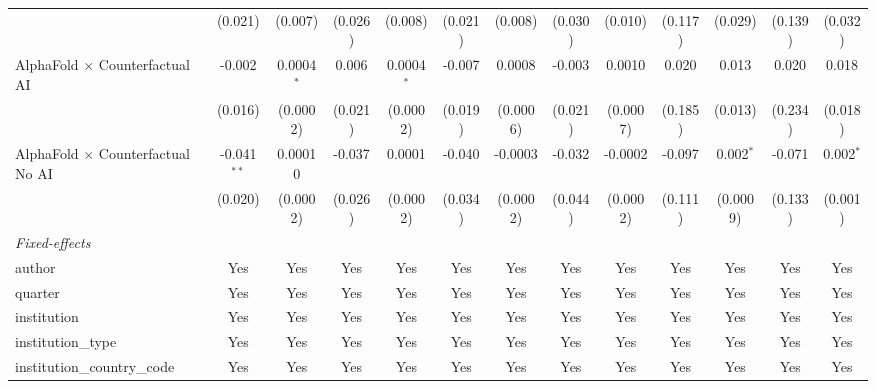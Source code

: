 \begin{tabular}{lcccccccccccc}
                                            & (0.021)       & (0.007)       & (0.026) & (0.008)      & (0.021)      & (0.008)        & (0.030)      & (0.010)        & (0.117) & (0.029)      & (0.139) & (0.032)\\   
   AlphaFold $\times$ Counterfactual AI     & -0.002        & 0.0004$^{*}$  & 0.006   & 0.0004$^{*}$ & -0.007       & 0.0008         & -0.003       & 0.0010         & 0.020   & 0.013        & 0.020   & 0.018\\   
                                            & (0.016)       & (0.0002)      & (0.021) & (0.0002)     & (0.019)      & (0.0006)       & (0.021)      & (0.0007)       & (0.185) & (0.013)      & (0.234) & (0.018)\\   
   AlphaFold $\times$ Counterfactual No AI  & -0.041$^{**}$ & 0.00010       & -0.037  & 0.0001       & -0.040       & -0.0003        & -0.032       & -0.0002        & -0.097  & 0.002$^{*}$  & -0.071  & 0.002$^{*}$\\   
                                            & (0.020)       & (0.0002)      & (0.026) & (0.0002)     & (0.034)      & (0.0002)       & (0.044)      & (0.0002)       & (0.111) & (0.0009)     & (0.133) & (0.001)\\   
   \midrule
   \emph{Fixed-effects}\\
   author                                   & Yes           & Yes           & Yes     & Yes          & Yes          & Yes            & Yes          & Yes            & Yes     & Yes          & Yes     & Yes\\  
   quarter                                  & Yes           & Yes           & Yes     & Yes          & Yes          & Yes            & Yes          & Yes            & Yes     & Yes          & Yes     & Yes\\  
   institution                              & Yes           & Yes           & Yes     & Yes          & Yes          & Yes            & Yes          & Yes            & Yes     & Yes          & Yes     & Yes\\  
   institution\_type                        & Yes           & Yes           & Yes     & Yes          & Yes          & Yes            & Yes          & Yes            & Yes     & Yes          & Yes     & Yes\\  
   institution\_country\_code               & Yes           & Yes           & Yes     & Yes          & Yes          & Yes            & Yes          & Yes            & Yes     & Yes          & Yes     & Yes\\  

\end{tabular}
